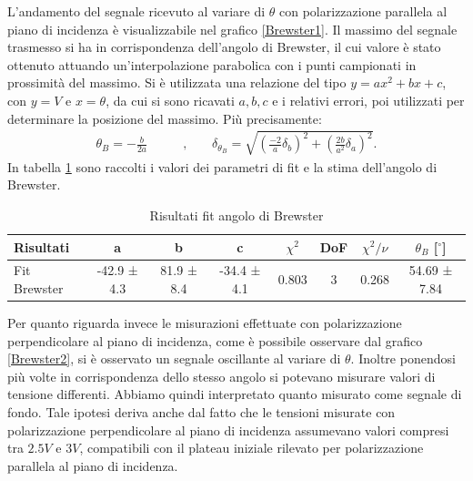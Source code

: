 \documentclass[a4paper]{article}
\begin{document}
L'andamento del segnale ricevuto al variare di $\theta$ con polarizzazione parallela al piano di incidenza è visualizzabile nel grafico \ref{Brewster1}. Il massimo del segnale trasmesso si ha in corrispondenza dell'angolo di Brewster, il cui valore è stato ottenuto attuando un'interpolazione parabolica con i punti campionati in prossimità del massimo. Si è utilizzata una relazione del tipo $y = ax^2 + bx +c$, con $y= V$ e $x=\theta$, da cui si sono ricavati $a, b, c$ e i relativi errori, poi utilizzati per determinare la posizione del massimo. Più precisamente:
\begin{align}
  \theta_{B} = -\frac{b}{2a} \qquad & \text{,}\qquad
  \delta_{\theta_{B}} = \sqrt{(\frac{-2}{a}\delta_b)^2 +(\frac{2b}{a^2}\delta_a)^2}. \label{eq:angolo brewster}
\end{align}
In tabella \ref{tab:fit.brewster} sono raccolti i valori dei parametri di fit e la stima dell'angolo di Brewster.
\begin{table}[htbp]
\centering
\begin{tabular}{|l|ccccccc|}
\hline
Risultati & a & b & c & $\chi^2$ & DoF & $\chi^2/\nu$ & $\theta_B$ [$^\circ$]\\\hline\hline
Fit Brewster & -42.9 ± 4.3 & 81.9 ± 8.4 & -34.4 ± 4.1 & 0.803 & 3 & 0.268 & 54.69 ± 7.84 \\\hline
\end{tabular}
\caption{Risultati fit angolo di Brewster}
\label{tab:fit.brewster}
\end{table}
Per quanto riguarda invece le misurazioni effettuate con polarizzazione perpendicolare al piano di incidenza, come è possibile osservare dal grafico \ref{Brewster2}, si è osservato un segnale oscillante al variare di $\theta$. Inoltre ponendosi più volte in corrispondenza dello stesso angolo si potevano misurare valori di tensione differenti. Abbiamo quindi interpretato quanto misurato come segnale di fondo. Tale ipotesi deriva anche dal fatto che le tensioni misurate con polarizzazione perpendicolare al piano di incidenza assumevano valori compresi tra $2.5V$ e $3V$, compatibili con il plateau iniziale rilevato per polarizzazione parallela al piano di incidenza.
\end{document}

